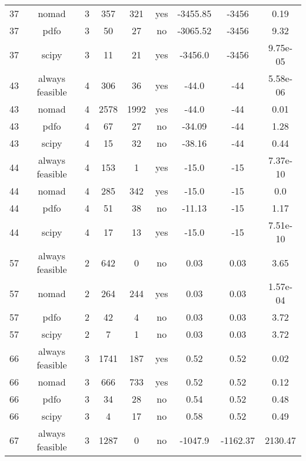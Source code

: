 \begin{scriptsize}
\begin{center}
\begin{longtable}{ccccccccc}
 37 &           nomad &  3 &    357 &    321 &     yes &    -3455.85 &       -3456 &     0.19\\
 37 &            pdfo &  3 &     50 &     27 &      no &    -3065.52 &       -3456 &     9.32\\
 37 &           scipy &  3 &     11 &     21 &     yes &     -3456.0 &       -3456 & 9.75e-05\\
 43 & always feasible &  4 &    306 &     36 &     yes &       -44.0 &         -44 & 5.58e-06\\
 43 &           nomad &  4 &   2578 &   1992 &     yes &       -44.0 &         -44 &     0.01\\
 43 &            pdfo &  4 &     67 &     27 &      no &      -34.09 &         -44 &     1.28\\
 43 &           scipy &  4 &     15 &     32 &      no &      -38.16 &         -44 &     0.44\\
 44 & always feasible &  4 &    153 &      1 &     yes &       -15.0 &         -15 & 7.37e-10\\
 44 &           nomad &  4 &    285 &    342 &     yes &       -15.0 &         -15 &      0.0\\
 44 &            pdfo &  4 &     51 &     38 &      no &      -11.13 &         -15 &     1.17\\
 44 &           scipy &  4 &     17 &     13 &     yes &       -15.0 &         -15 & 7.51e-10\\
 57 & always feasible &  2 &    642 &      0 &      no &        0.03 &        0.03 &     3.65\\
 57 &           nomad &  2 &    264 &    244 &     yes &        0.03 &        0.03 & 1.57e-04\\
 57 &            pdfo &  2 &     42 &      4 &      no &        0.03 &        0.03 &     3.72\\
 57 &           scipy &  2 &      7 &      1 &      no &        0.03 &        0.03 &     3.72\\
 66 & always feasible &  3 &   1741 &    187 &     yes &        0.52 &        0.52 &     0.02\\
 66 &           nomad &  3 &    666 &    733 &     yes &        0.52 &        0.52 &     0.12\\
 66 &            pdfo &  3 &     34 &     28 &      no &        0.54 &        0.52 &     0.48\\
 66 &           scipy &  3 &      4 &     17 &      no &        0.58 &        0.52 &     0.49\\
 67 & always feasible &  3 &   1287 &      0 &      no &     -1047.9 &    -1162.37 &  2130.47\\

\end{longtable}
\end{center}
\end{scriptsize}
